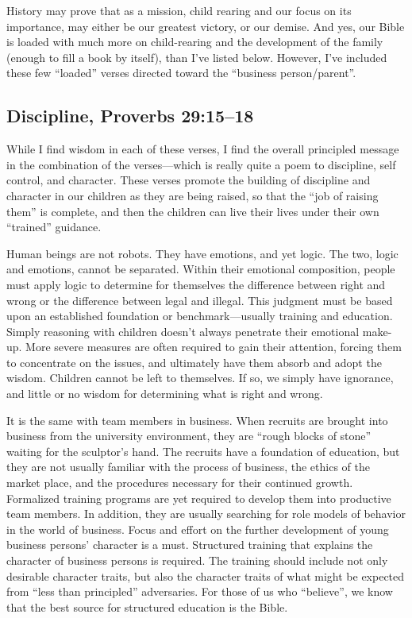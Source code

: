 \documentclass[12pt]{memoir}
\begin{document}
History may prove that as a mission, child rearing and our focus on
its importance, may either be our greatest victory, or our demise.
And yes, our Bible is loaded with much more on child-rearing and the
development of the family (enough to fill a book by itself), than
I've listed below. However, I've included these few ``loaded'' verses
directed toward the ``business person\slash{}parent''.

\subsection[Discipline]{Discipline, Proverbs 29:15--18}

While I find wisdom in each of these verses, I find the overall principled
message in the combination of the verses---which is really quite
a poem to discipline, self control, and character. These verses promote
the building of discipline and character in our children as they are
being raised, so that the ``job of raising them'' is complete, and
then the children can live their lives under their own ``trained''
guidance.

Human beings are not robots. They have emotions, and yet logic. The
two, logic and emotions, cannot be separated. Within their emotional
composition, people must apply logic to determine for themselves the
difference between right and wrong or the difference between legal
and illegal. This judgment must be based upon an established foundation
or benchmark---usually training and education. Simply reasoning with
children doesn't always penetrate their emotional make-up. More severe
measures are often required to gain their attention, forcing them
to concentrate on the issues, and ultimately have them absorb and
adopt the wisdom. Children cannot be left to themselves. If so, we
simply have ignorance, and little or no wisdom for determining what
is right and wrong.

It is the same with team members in business. When recruits are brought
into business from the university environment, they are ``rough blocks
of stone'' waiting for the sculptor's hand. The recruits have a foundation
of education, but they are not usually familiar with the process of
business, the ethics of the market place, and the procedures necessary
for their continued growth. Formalized training programs are yet required
to develop them into productive team members. In addition, they are
usually searching for role models of behavior in the world of business.
Focus and effort on the further development of young business persons'
character is a must. Structured training that explains the character
of business persons is required. The training should include not only
desirable character traits, but also the character traits of what
might be expected from ``less than principled'' adversaries. For
those of us who ``believe'', we know that the best source for structured
education is the Bible.
\end{document}
